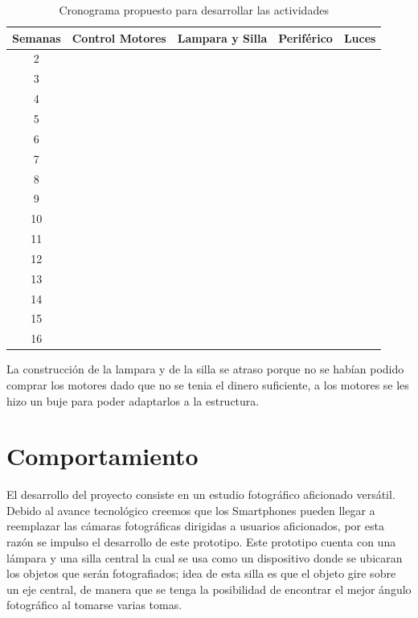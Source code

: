 \documentclass[twocolumn]{IEEEtran}
\begin{document}
\begin{table}[H]
	\centering
\begin{tabular}{|c|c|c|c|c|}\hline
Semanas & Control Motores & Lampara y Silla & Periférico & Luces \\ \hline

2 & & & & \\ \hline
3 & & & & \\ \hline
4 & & & & \\ \hline
5 & & & & \\ \hline
6 & & & & \\ \hline
7 & & & & \\ \hline
8 & & & & \\ \hline
9 & \cellcolor{black} & & & \\ \hline
10 & \cellcolor{black} & \cellcolor{black} & & \\ \hline
11 & & \cellcolor{black} & & \\ \hline
12 & & \cellcolor{black} & \cellcolor{black} & \\ \hline
13 & & & \cellcolor{black} & \cellcolor{black} \\ \hline
14 & & & & \cellcolor{black} \\ \hline
15 & & & & \\ \hline
16 & & & & \\ \hline
    \end{tabular}
	\caption{Cronograma propuesto para desarrollar las actividades}
	\label{tab2}
\end{table}
\noindent
La construcción de la lampara y de la silla se atraso porque no se habían podido comprar los motores dado que no se tenia el dinero suficiente, a los motores se les hizo un buje para poder adaptarlos a la estructura.\\

\section{Comportamiento}
\noindent
El desarrollo del proyecto consiste en  un estudio fotográfico aficionado versátil. Debido al avance tecnológico creemos que los Smartphones pueden llegar a reemplazar las cámaras fotográficas dirigidas a usuarios aficionados, por esta razón se impulso el desarrollo de este prototipo.
Este prototipo cuenta con una lámpara y una silla central la cual se usa como un dispositivo donde se ubicaran los objetos que serán fotografiados; idea de esta silla es que el objeto gire sobre un eje central, de manera que se tenga la posibilidad de encontrar el mejor ángulo fotográfico al tomarse varias tomas.\\
\end{document}
